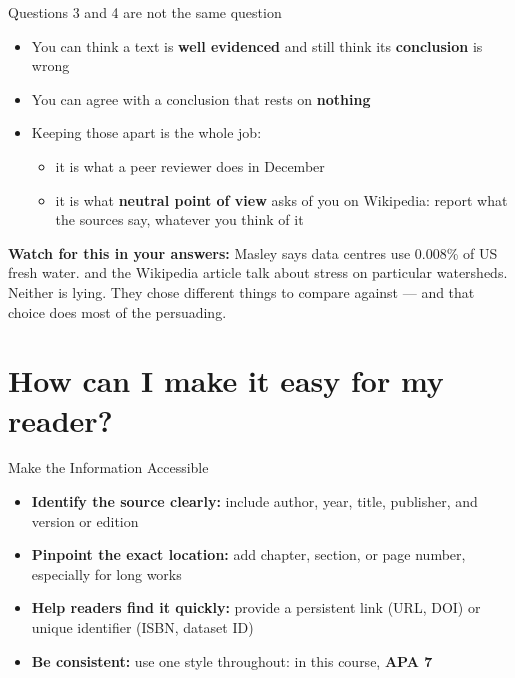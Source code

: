 \documentclass[aspectratio=169]{beamer}
\begin{document}
\begin{frame}{Questions 3 and 4 are not the same question}
\begin{itemize}
  \item You can think a text is \textbf{well evidenced} and still think its
    \textbf{conclusion} is wrong
  \item You can agree with a conclusion that rests on \textbf{nothing}
  \item Keeping those apart is the whole job:
    \begin{itemize}
    \item it is what a peer reviewer does in December
    \item it is what \textbf{neutral point of view} asks of you on Wikipedia:
      report what the sources say, whatever you think of it
    \end{itemize}
\end{itemize}
\vspace{2ex}
\textbf{Watch for this in your answers:} Masley says data centres use 0.008\%
of US fresh water.  \citet{Mytton2021} and the Wikipedia article talk about
stress on particular watersheds.  Neither is lying.  They chose
different things to compare against --- and that choice does most of the
persuading.
\end{frame}

\section{How can I make it easy for my reader?}

\begin{frame}{Make the Information Accessible}

\begin{itemize}
  \item {} \textbf{Identify the source clearly:}
    include author, year, title, publisher, and version or edition
  \item {} \textbf{Pinpoint the exact location:}
    add chapter, section, or page number, especially for long works
  \item {} \textbf{Help readers find it quickly:}
    provide a persistent link (URL, DOI) or unique identifier (ISBN, dataset ID)
  \item {} \textbf{Be consistent:}
    use one style throughout: in this course, \textbf{APA 7}
\end{itemize}

\end{frame}
\end{document}
